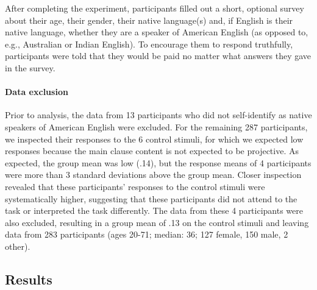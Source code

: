 \documentclass[11pt,fleqn]{article}
\newcommand{\6}{\mbox{$[\hspace*{-.6mm}[$}}
\newcommand{\9}{\mbox{$]\hspace*{-.6mm}]$}}
\begin{document}
After completing the experiment, participants filled out a short, optional survey about their age, their gender, their native language(s) and, if English is their native language, whether they are a speaker of American English (as opposed to, e.g., Australian or Indian English). To encourage them to respond truthfully, participants were told that they would be paid no matter what answers they gave in the survey.

\paragraph{Data exclusion}
Prior to analysis, the data from 13 participants who did not self-identify as native speakers of American English were excluded. For the remaining 287 participants, we inspected their responses to the 6 control stimuli, for which we expected low responses because the main clause content is not expected to be projective. As expected, the group mean was low (.14), but the response means of 4 participants were more than 3 standard deviations above the group mean. Closer inspection revealed that these participants' responses to the control stimuli were systematically higher, suggesting that these participants did not attend to the task or interpreted the task differently. The data from these 4 participants were also excluded, resulting in a group mean of .13 on the control stimuli and leaving data from 283 participants (ages 20-71; median: 36; 127 female, 150 male, 2 other).

\subsection{Results}
\end{document}
